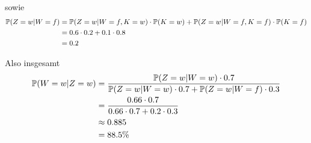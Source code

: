 \documentclass[a4paper]{article}
\newcommand{\IP}{\mathbb{P}}
\begin{document}
sowie
\begin{align}
	\IP(Z=w|W=f) &= \IP(Z=w|W=f,K=w) \cdot \IP(K=w) + \IP(Z=w|W=f,K=f) \cdot \IP(K=f) \notag \\
							 &= 0.6 \cdot 0.2 + 0.1 \cdot 0.8 \notag \\
							 &= 0.2 \notag
\end{align}

Also insgesamt
\begin{align}
	\IP(W=w|Z=w) &= \frac{\IP(Z=w|W=w) \cdot 0.7}{\IP(Z=w|W=w) \cdot 0.7 + \IP(Z=w|W=f) \cdot 0.3} \notag \\
							 &= \frac{0.66 \cdot 0.7}{0.66 \cdot 0.7 + 0.2 \cdot 0.3} \notag \\
							 &\approx 0.885 \notag \\
							 &= 88.5\% \notag						 
\end{align}
\end{document}
